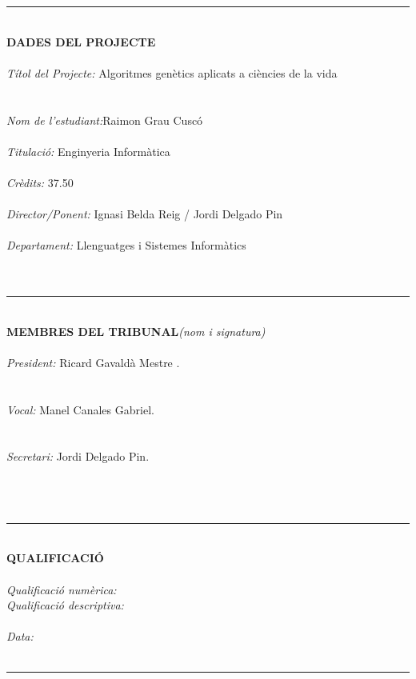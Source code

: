 \documentclass[titlepage,a4paper,12pt]{book}
\begin{document}

\thispagestyle{empty}
\rule{160mm}{0.20mm}\\
\textbf{DADES DEL PROJECTE}\\
\\
\textit{Títol del Projecte:} Algoritmes genètics aplicats a ciències de la vida\\
\\
\\
\textit{Nom de l'estudiant:}Raimon Grau Cuscó\\
\\
\textit{Titulació:} Enginyeria Informàtica\\
\\
\textit{Crèdits:} 37.50 \\
\\
\textit{Director/Ponent:} Ignasi Belda Reig / Jordi Delgado Pin\\
\\
\textit{Departament:} Llenguatges i Sistemes Informàtics\\
\\
\\
\rule{160mm}{0.20mm}\\
\textbf{MEMBRES DEL TRIBUNAL}\textit{(nom i signatura)}\\
\\
\textit{President:} Ricard Gavaldà Mestre .\\
\\
\\
\textit{Vocal:} Manel Canales Gabriel.\\
\\
\\
\textit{Secretari:} Jordi Delgado Pin.\\
\\
\\
\\
\rule{160mm}{0.20mm}\\
\textbf{QUALIFICACIÓ}\\
\\
\textit{Qualificació numèrica:}\\
\textit{Qualificació descriptiva:}\\
\\
\textit{Data:}
\\
\\
\rule{160mm}{0.20mm}\\
\newpage{\pagestyle{empty}\cleardoublepage}
\end{document}
